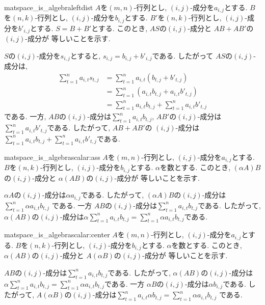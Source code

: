 \begin{proofof*}{matspace_is_algebra}{leftdist}
  $A$を$(m,n)$-行列とし, $(i,j)$-成分を$a_{i,j}$とする.
  $B$を$(n,k)$-行列とし, $(i,j)$-成分を$b_{i,j}$とする.
  $B'$を$(n,k)$-行列とし, $(i,j)$-成分を$b'_{i,j}$とする.
  $S=B+B'$とする.
  このとき,
  $AS$の$(i,j)$-成分と
  $AB+AB'$の$(i,j)$-成分が
  等しいことを示す.

  $S$の$(i,j)$-成分を$s_{i,j}$とすると,
  $s_{i,j}=b_{i,j}+b'_{i,j}$である.
  したがって
  $AS$の$(i,j)$-成分は,
  \begin{align*}
    \sum_{t=1}^{n}a_{i,t}s_{t,j}
    &=\sum_{t=1}^{n}a_{i,t}(b_{t,j}+b'_{t,j})\\
    &=\sum_{t=1}^{n}(a_{i,t}b_{t,j}+a_{i,t}b'_{t,j})\\
    &=\sum_{t=1}^{n}a_{i,t}b_{t,j}+\sum_{t=1}^{n}a_{i,t}b'_{t,j}
  \end{align*}
  である.
  一方,
  $AB$の$(i,j)$-成分は$\sum_{t=1}^{n}a_{i,t}b_{t,j}$,
  $AB'$の$(i,j)$-成分は$\sum_{t=1}^{n}a_{i,t}b'_{t,j}$である.
  したがって, $AB+AB'$の
  $(i,j)$-成分は$\sum_{t=1}^{n}a_{i,t}b_{t,j}+\sum_{t=1}^{n}a_{i,t}b'_{t,j}$である.
\end{proofof*}

\begin{proofof*}{matspace_is_algebra}{scalar:ass}
  $A$を$(m,n)$-行列とし, $(i,j)$-成分を$a_{i,j}$とする.
  $B$を$(n,k)$-行列とし, $(i,j)$-成分を$b_{i,j}$とする.
  $\alpha$を数とする.
  このとき,
  $(\alpha A)B$の$(i,j)$-成分と
  $\alpha(AB)$の$(i,j)$-成分が
  等しいことを示す.

  $\alpha A$の$(i,j)$-成分は$\alpha a_{i,j}$である.
  したがって,
  $(\alpha A)B$の$(i,j)$-成分は$\sum_{t=1}^{n} \alpha a_{i,t}b_{t,j}$
  である.
  一方
  $AB$の$(i,j)$-成分は$\sum_{t=1}^{n} a_{i,t}b_{t,j}$である.
  したがって,
  $\alpha(AB)$の$(i,j)$-成分は$\alpha\sum_{t=1}^{n} a_{i,t}b_{t,j}=\sum_{t=1}^{n} \alpha a_{i,t}b_{t,j}$である.
\end{proofof*}
  
\begin{proofof*}{matspace_is_algebra}{scalar:center}
  $A$を$(m,n)$-行列とし, $(i,j)$-成分を$a_{i,j}$とする.
  $B$を$(n,k)$-行列とし, $(i,j)$-成分を$b_{i,j}$とする.
  $\alpha$を数とする.
  このとき,
  $\alpha (AB)$の$(i,j)$-成分と
  $A(\alpha B)$の$(i,j)$-成分が
  等しいことを示す.

  $AB$の$(i,j)$-成分は$\sum_{t=1}^{n} a_{i,t}b_{t,j}$である.
  したがって,
  $\alpha(AB)$の$(i,j)$-成分は$\alpha\sum_{t=1}^{n} a_{i,t}b_{t,j}=\sum_{t=1}^{n} \alpha a_{i,t}b_{t,j}$である.
  一方
  $\alpha B$の$(i,j)$-成分は$\alpha b_{i,j}$である.
  したがって,
  $A(\alpha B)$の$(i,j)$-成分は$\sum_{t=1}^{n}  a_{i,t}\alpha b_{t,j}=\sum_{t=1}^{n}  \alpha a_{i,t} b_{t,j}$
  である.
\end{proofof*}
  
